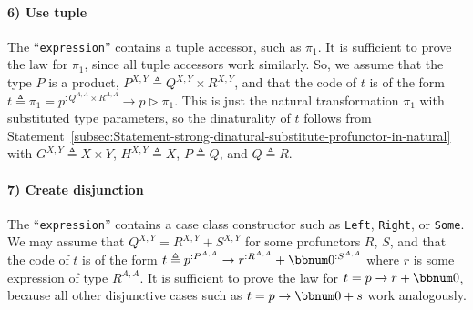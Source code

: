 \paragraph{6) Use tuple }

The \textsf{``}\lstinline!expression!\textsf{''} contains a tuple accessor, such
as $\pi_{1}$. It is sufficient to prove the law for $\pi_{1}$, since
all tuple accessors work similarly. So, we assume that the type $P$
is a product, $P^{X,Y}\triangleq Q^{X,Y}\times R^{X,Y}$, and that
the code of $t$ is of the form $t\triangleq\pi_{1}=p^{:Q^{A,A}\times R^{A,A}}\rightarrow p\triangleright\pi_{1}$.
This is just the natural transformation $\pi_{1}$ with substituted
type parameters, so the dinaturality of $t$ follows from Statement~\ref{subsec:Statement-strong-dinatural-substitute-profunctor-in-natural}
with $G^{X,Y}\triangleq X\times Y$, $H^{X,Y}\triangleq X$, $P\triangleq Q$,
and $Q\triangleq R$.

\paragraph{7) Create disjunction}

The \textsf{``}\lstinline!expression!\textsf{''} contains a case class constructor
such as \lstinline!Left!, \lstinline!Right!, or \lstinline!Some!.
We may assume that $Q^{X,Y}=R^{X,Y}+S^{X,Y}$ for some profunctors
$R$, $S$, and that the code of $t$ is of the form $t\triangleq p^{:P^{A,A}}\rightarrow r^{:R^{A,A}}+\bbnum 0^{:S^{A,A}}$
where $r$ is some expression of type $R^{A,A}$. It is sufficient
to prove the law for $t=p\rightarrow r+\bbnum 0$, because all other
disjunctive cases such as $t=p\rightarrow\bbnum 0+s$ work analogously.

